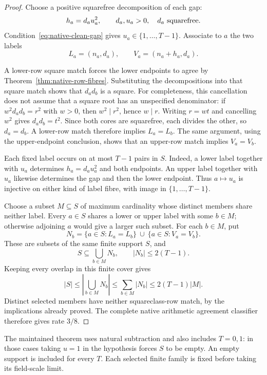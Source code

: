\documentclass[11pt]{article}
\begin{document}
\begin{proof}
Choose a positive squarefree decomposition of each gap:
\[
 h_a=d_a u_a^2,\qquad d_a,u_a>0,\quad d_a\ \hbox{squarefree}.
\]
Condition~\eqref{eq:native-clean-gap} gives
\(u_a\in\{1,\ldots,T-1\}\). Associate to \(a\) the two labels
\[
 L_a=(n_a,d_a),\qquad V_a=(n_a+h_a,d_a).
\]

A lower-row square match forces the lower endpoints to agree by
Theorem~\ref{thm:native-row-fibres}. Substituting the decompositions
into that square match shows that \(d_ad_b\) is a square.
For completeness, this cancellation does not assume that a square
root has an unspecified denominator: if \(w^2d_ad_b=r^2\) with
\(w>0\), then \(w^2\mid r^2\), hence \(w\mid r\).
Writing \(r=wt\) and cancelling \(w^2\) gives \(d_ad_b=t^2\).
Since both cores are squarefree, each divides the other, so
\(d_a=d_b\). A lower-row match therefore implies \(L_a=L_b\).
The same argument, using the upper-endpoint conclusion, shows
that an upper-row match implies \(V_a=V_b\).

Each fixed label occurs on at most \(T-1\) pairs in \(S\).
Indeed, a lower label together with \(u_a\) determines
\(h_a=d_au_a^2\) and both endpoints.
An upper label together with \(u_a\) likewise determines the gap
and then the lower endpoint. Thus \(a\mapsto u_a\) is injective
on either kind of label fibre, with image in
\(\{1,\ldots,T-1\}\).

Choose a subset \(M\subseteq S\) of maximum cardinality whose
distinct members share neither label. Every \(a\in S\) shares
a lower or upper label with some \(b\in M\); otherwise adjoining
\(a\) would give a larger such subset.
For each \(b\in M\), put
\[
 N_b=\{a\in S:L_a=L_b\}\ \cup\ \{a\in S:V_a=V_b\}.
\]
These are subsets of the same finite support \(S\), and
\[
 S\subseteq\bigcup_{b\in M}N_b,\qquad
 |N_b|\le2(T-1).
\]
Keeping every overlap in this finite cover gives
\[
 |S|\le\left|\bigcup_{b\in M}N_b\right|
       \le\sum_{b\in M}|N_b|
       \le2(T-1)|M|.
\]
Distinct selected members have neither squareclass-row match,
by the implications already proved. The complete native
arithmetic agreement classifier therefore gives rate \(3/8\).
\end{proof}

The maintained theorem uses natural subtraction and also includes
\(T=0,1\): in those cases taking \(u=1\) in the hypothesis forces
\(S\) to be empty. An empty support is included for every \(T\).
Each selected finite family is fixed before taking its field-scale limit.
\end{document}
